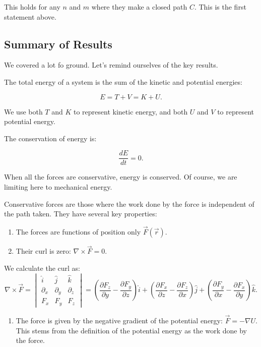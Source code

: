 \documentclass[11pt]{article}
\providecommand{\tightlist}{%
      \setlength{\itemsep}{0pt}\setlength{\parskip}{0pt}}
\begin{document}
This holds for any \(n\) and \(m\) where they make a closed path \(C\).
This is the first statement above.

    \subsection{Summary of Results}\label{summary-of-results}

We covered a lot fo ground. Let's remind ourselves of the key results.

The total energy of a system is the sum of the kinetic and potential
energies:

\[E = T + V = K +U.\]

We use both \(T\) and \(K\) to represent kinetic energy, and both \(U\)
and \(V\) to represent potential energy.

The conservation of energy is:

\[\dfrac{dE}{dt} = 0.\]

When all the forces are conservative, energy is conserved. Of course, we
are limiting here to mechanical energy.

Conservative forces are those where the work done by the force is
independent of the path taken. They have several key properties:

\begin{enumerate}
\def\labelenumi{\arabic{enumi}.}
\tightlist
\item
  The forces are functions of position only \(\vec{F}(\vec{r})\).
\item
  Their curl is zero: \(\nabla \times \vec{F} = 0\).
\end{enumerate}

We calculate the curl as:
\[\nabla \times \vec{F} = \begin{vmatrix}\hat{i} & \hat{j} & \hat{k} \\ \partial_x & \partial_y & \partial_z \\ F_x & F_y & F_z \end{vmatrix} = \left(\dfrac{\partial F_z}{\partial y} - \dfrac{\partial F_y}{\partial z}\right)\hat{i} + \left(\dfrac{\partial F_x}{\partial z} - \dfrac{\partial F_z}{\partial x}\right)\hat{j} + \left(\dfrac{\partial F_y}{\partial x} - \dfrac{\partial F_x}{\partial y}\right)\hat{k}.\]

\begin{enumerate}
\def\labelenumi{\arabic{enumi}.}
\setcounter{enumi}{2}
\tightlist
\item
  The force is given by the negative gradient of the potential energy:
  \(\vec{F} = -\nabla U\). This stems from the definition of the
  potential energy as the work done by the force.
\end{enumerate}
\end{document}

